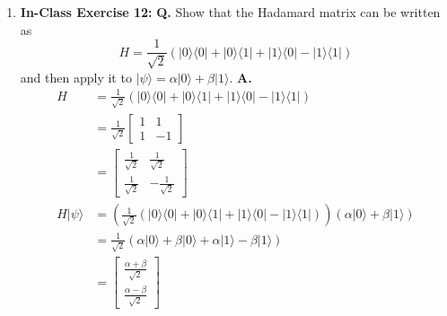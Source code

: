\documentclass[main.tex]{subfiles}
\begin{document}
\begin{enumerate}
\item[] \textbf{In-Class Exercise 12:}  \textbf{Q.} Show that the Hadamard matrix can be written as 
$$H= \frac{1}{\sqrt{2}} \left(|0\rangle\langle 0|+| 0\rangle\langle 1|+| 1\rangle\langle 0|-| 1\rangle\langle 1|\right)$$ 
and then apply it to $|\psi\rangle=\alpha|0\rangle+\beta|1\rangle$.  \textbf{A.}
    \begin{align*}
        H               & = \frac{1}{\sqrt{2}}\left(|0\rangle\langle0|+|0\rangle\langle1|
                        +|1\rangle\langle0|-|1\rangle\langle1|\right) \\
                        & = \frac{1}{\sqrt{2}}\left[\begin{array}{cc} 1 & 1 \\ 1 & -1\end{array}\right]\\
                        & = \left[\begin{array}{cc} \frac{1}{\sqrt{2}} & \frac{1}{\sqrt{2}} \\
                        \frac{1}{\sqrt{2}} & -\frac{1}{\sqrt{2}}\end{array}\right]\\
        H |\psi\rangle  & = \left(\frac{1}{\sqrt{2}}\left(|0\rangle\langle0|+|0\rangle\langle1|
                        +|1\rangle\langle0|-|1\rangle\langle1|\right)\right)
                        \left(\alpha|0\rangle+\beta|1\rangle\right) \\ 
                        & = \frac{1}{\sqrt{2}}\left(\alpha|0\rangle+\beta|0\rangle
                        +\alpha|1\rangle-\beta|1\rangle\right)\\
                        & = \left[\begin{array}{cc} \frac{\alpha+\beta}{\sqrt{2}} \\
                        \frac{\alpha-\beta}{\sqrt{2}}\end{array}\right]\\
    \end{align*}
\end{enumerate}
\end{document}
